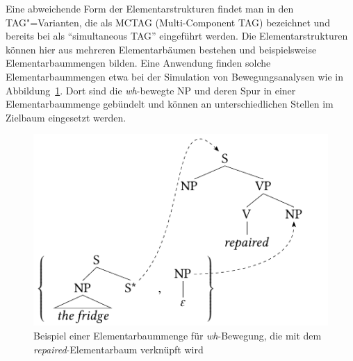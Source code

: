 Eine abweichende Form der Elementarstrukturen findet man in den TAG"=Varianten, die als \textsc{MCTAG} (Multi-Component TAG) bezeichnet und bereits bei \cite{Joshi:etal:75} als "`simultaneous TAG"' eingeführt werden. Die Elementarstrukturen können hier aus mehreren Elementarbäumen bestehen und beispielsweise Elementarbaummengen bilden. Eine Anwendung finden solche Elementarbaummengen  etwa bei der Simulation von Bewegungsanalysen wie in Abbildung~\ref{fig-mctag-bsp}. Dort sind die \textit{wh}-bewegte NP und deren Spur in einer Elementarbaummenge gebündelt und können an unterschiedlichen Stellen im Zielbaum eingesetzt werden.  
\begin{figure}[p]
\centering
\includegraphics{graphics/abb55.pdf}
\caption{\label{fig-mctag-bsp}Beispiel einer Elementarbaummenge für \textit{wh}-Bewegung, die mit dem {\it repaired}-Elementarbaum verknüpft wird}
\end{figure}
